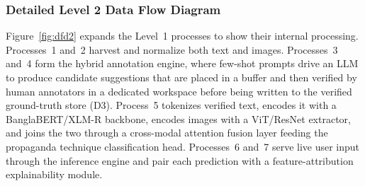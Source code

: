 \documentclass[12pt,a4paper]{report}
\begin{document}
\subsubsection{Detailed Level 2 Data Flow Diagram}
\label{sec:dfd2}
Figure~\ref{fig:dfd2} expands the Level~1 processes to show their internal
processing. Processes~1 and~2 harvest and normalize both text and images.
Processes~3 and~4 form the hybrid annotation engine, where few-shot prompts drive an
LLM to produce candidate suggestions that are placed in a buffer and then verified
by human annotators in a dedicated workspace before being written to the verified
ground-truth store (D3). Process~5 tokenizes verified text, encodes it with a
BanglaBERT/XLM-R backbone, encodes images with a ViT/ResNet extractor, and joins the
two through a cross-modal attention fusion layer feeding the propaganda technique
classification head. Processes~6 and~7 serve live user input through the inference
engine and pair each prediction with a feature-attribution explainability module.
\end{document}
